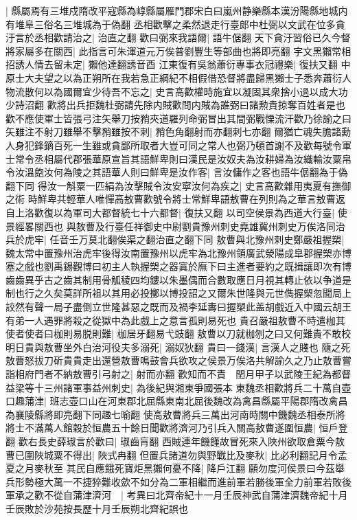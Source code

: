 |{
	縣屬焉有三堆戍隋改平寇縣為崞縣屬雁門郡宋白曰嵐州静樂縣本漢汾陽縣地城内有堆阜三俗名三堆城為于偽翻}
丞相歡擊之柔然退走行臺郎中杜弼以文武在位多貪汙言於丞相歡請治之|{
	治直之翻}
歡曰弼來我語爾|{
	語牛倨翻}
天下貪汙習俗已久今督將家屬多在關西|{
	此指言可朱渾道元万俟普劉豐生等部曲也將即亮翻}
宇文黑獺常相招誘人情去留未定|{
	獺他達翻誘音酉}
江東復有吳翁蕭衍專事衣冠禮樂|{
	復扶又翻}
中原士大夫望之以為正朔所在我若急正綱紀不相假借恐督將盡歸黑獺士子悉奔蕭衍人物流散何以為國爾宜少待吾不忘之|{
	史言高歡權時施宜以凝固其衆捨小過以成大功少詩沼翻}
歡將出兵拒魏杜弼請先除内賊歡問内賊為誰弼曰諸勲貴掠奪百姓者是也歡不應使軍士皆張弓注矢舉刀按矟夾道羅列命弼冒出其間弼戰慄流汗歡乃徐諭之曰矢雖注不射刀雖舉不擊矟雖按不刺|{
	矟色角翻射而亦翻刺七亦翻}
爾猶亡魂失膽諸勳人身犯鋒鏑百死一生雖或貪鄙所取者大豈可同之常人也弼乃頓首謝不及歡每號令軍士常令丞相屬代郡張華原宣旨其語鮮卑則曰漢民是汝奴夫為汝耕婦為汝織輸汝粟帛令汝溫飽汝何為陵之其語華人則曰鮮卑是汝作客|{
	言汝傭作之客也語牛倨翻為于偽翻下同}
得汝一斛粟一匹絹為汝擊賊令汝安寧汝何為疾之|{
	史言高歡雜用夷夏有撫御之術}
時鮮卑共輕華人唯憚高敖曹歡號令將士常鮮卑語敖曹在列則為之華言敖曹返自上洛歡復以為軍司大都督統七十六都督|{
	復扶又翻}
以司空侯景為西道大行臺|{
	使景經畧關西也}
與敖曹及行臺任祥御史中尉劉貴豫州刺史堯雄冀州刺史万俟洛同治兵於虎牢|{
	任音壬万莫北翻俟渠之翻治直之翻下同}
敖曹與北豫州刺史鄭嚴祖握槊|{
	魏太常中置豫州治虎牢後得汝南置豫州以虎牢為北豫州領廣武滎陽成臯郡握槊亦博塞之戲也劉禹錫觀博曰初主人執握槊之器寘於廡下曰主進者要約之既揖讓即次有博齒齒異乎古之齒其制用骨觚稜四均鏤以朱墨偶而合數取應日月視其轉止依以争道是制也行之久矣莫詳所祖以其用必投擲以博投詔之又爾朱世隆與元世儁握槊忽聞局上詨然有聲一局子盡倒立世隆甚惡之既而及禍李延夀曰握槊此盖胡戲近入中國云胡王有弟一人遇罪將殺之從獄中為此戲上之意言孤則易死也}
貴召嚴祖敖曹不時遣枷其使者使者曰枷則易脱則難|{
	枷居牙翻易弋豉翻}
敖曹以刀就枷刎之曰又何難貴不敢校明日貴與敖曹坐外白治河役夫多溺死|{
	溺奴狄翻}
貴曰一錢漢|{
	言漢人之賤也}
隨之死敖曹怒拔刀斫貴貴走出還營敖曹鳴鼓會兵欲攻之侯景万俟洛共解諭久之乃止敖曹嘗詣相府門者不納敖曹引弓射之|{
	射而亦翻}
歡知而不責　閏月甲子以武陵王紀為都督益梁等十三州諸軍事益州刺史|{
	為後紀與湘東爭國張本}
東魏丞相歡將兵二十萬自壺口趣蒲津|{
	班志壺口山在河東郡北屈縣東南北屈後魏改為禽昌縣屬平陽郡隋改禽昌為襄陵縣將即亮翻下同趣七喻翻}
使高敖曹將兵三萬出河南時關中饑魏丞相泰所將將士不滿萬人館穀於恒農五十餘日聞歡將濟河乃引兵入關高敖曹遂圍恒農|{
	恒戶登翻}
歡右長史薛琡言於歡曰|{
	琡齒肓翻}
西賊連年饑饉故冒死來入陜州欲取倉粟今敖曹已圍陜城粟不得出|{
	陜式冉翻}
但置兵諸道勿與野戰比及麥秋|{
	比必利翻記月令孟夏之月麥秋至}
其民自應餓死寶炬黑獺何憂不降|{
	降戶江翻}
願勿度河侯景曰今茲舉兵形勢極大萬一不捷猝難收歛不如分為二軍相繼而進前軍若勝後軍全力前軍若敗後軍承之歡不從自蒲津濟河　|{
	考異曰北齊帝紀十一月壬辰神武自蒲津濟魏帝紀十月壬辰敗於沙苑按長歷十月壬辰朔北齊紀誤也}
